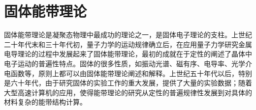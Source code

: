 \section{固体能带理论}
固体能带理论是凝聚态物理中最成功的理论之一，是固体电子理论的支柱。上世纪二十年代末和三十年代初，量子力学的运动规律确立后，在应用量子力学研究金属电导理论的过程中发展起来了固体能带理论，最初的成就在于定性的阐述了晶体中电子运动的普遍性特点。固体的很多性质，如振动光谱、磁有序、电导率、光学介电函数等，原则上都可以由固体能带理论阐述和解释。上世纪五十年代以后，特别是六十年代，由于研究固体的实验工作的重大发展，提供了大量的实验数据；随着大型高速计算机的应用，使得能带理论的研究从定性的普遍规律性发展到对具体的材料复杂的能带结构计算。


